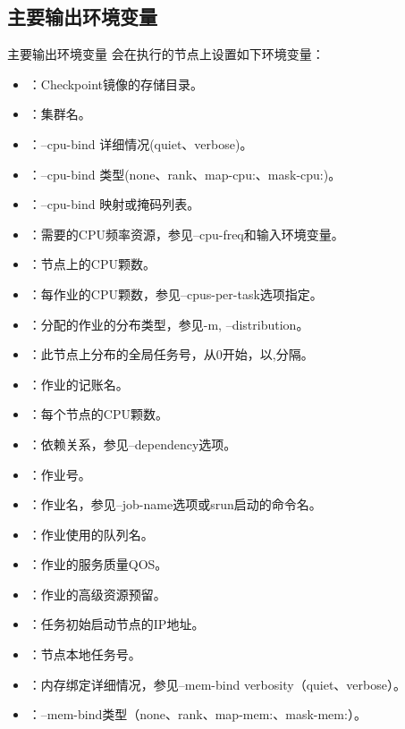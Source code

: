 \subsection{主要输出环境变量}
\begin{frame}{主要输出环境变量}
会在执行的节点上设置如下环境变量：
\begin{itemize}
	\item {}：Checkpoint镜像的存储目录。
	\item {}：集群名。
	\item {}：--cpu-bind 详细情况(quiet、verbose)。
	\item {}：--cpu-bind 类型(none、rank、map-cpu:、mask-cpu:)。
	\item {}：--cpu-bind 映射或掩码列表。
	\item {}：需要的CPU频率资源，参见--cpu-freq和输入环境变量。
	\item {}：节点上的CPU颗数。
	\item {}：每作业的CPU颗数，参见--cpus-per-task选项指定。
	\item {}：分配的作业的分布类型，参见-m, --distribution。
	\item {}：此节点上分布的全局任务号，从0开始，以,分隔。
	\item {}：作业的记账名。
	\item {}：每个节点的CPU颗数。
	\item {}：依赖关系，参见--dependency选项。
	\item {}：作业号。
	\item {}：作业名，参见--job-name选项或srun启动的命令名。
	\item {}：作业使用的队列名。
	\item {}：作业的服务质量QOS。
	\item {}：作业的高级资源预留。
	\item {}：任务初始启动节点的IP地址。
	\item {}：节点本地任务号。
	\item {}：内存绑定详细情况，参见--mem-bind verbosity（quiet、verbose）。
	\item {}：--mem-bind类型（none、rank、map-mem:、mask-mem:）。

\end{itemize}
\end{frame}
